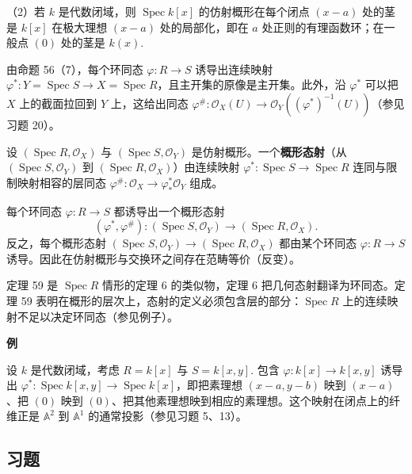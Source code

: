 （2）若 \(k\) 是代数闭域，则 \(\operatorname{Spec}k[x]\) 的仿射概形在每个闭点 \((x-a)\) 处的茎是 \(k[x]\) 在极大理想 \((x-a)\) 处的局部化，即在 \(a\) 处正则的有理函数环；在一般点 \((0)\) 处的茎是 \(k(x)\).

由命题 56（7），每个环同态 \(\varphi : R \to S\) 诱导出连续映射 \(\varphi^* : Y = \operatorname{Spec}S \to X = \operatorname{Spec}R\)，且主开集的原像是主开集。此外，沿 \(\varphi^*\) 可以把 \(X\) 上的截面拉回到 \(Y\) 上，这给出同态 \(\varphi^{\#} : \mathcal{O}_X(U) \to \mathcal{O}_Y((\varphi^*)^{-1}(U))\)（参见习题 20）。

\begin{definition}
设 \((\operatorname{Spec}R, \mathcal{O}_X)\) 与 \((\operatorname{Spec}S, \mathcal{O}_Y)\) 是仿射概形。一个\textbf{概形态射}（从 \((\operatorname{Spec}S, \mathcal{O}_Y)\) 到 \((\operatorname{Spec}R, \mathcal{O}_X)\)）由连续映射 \(\varphi^* : \operatorname{Spec}S \to \operatorname{Spec}R\) 连同与限制映射相容的层同态 \(\varphi^{\#} : \mathcal{O}_X \to \varphi^*_*\mathcal{O}_Y\) 组成。
\end{definition}

\begin{theorem}\label{thm:15.59}
每个环同态 \(\varphi : R \to S\) 都诱导出一个概形态射
\[
(\varphi^*, \varphi^{\#}) : (\operatorname{Spec}S, \mathcal{O}_Y) \to (\operatorname{Spec}R, \mathcal{O}_X).
\]
反之，每个概形态射 \((\operatorname{Spec}S, \mathcal{O}_Y) \to (\operatorname{Spec}R, \mathcal{O}_X)\) 都由某个环同态 \(\varphi : R \to S\) 诱导。因此在仿射概形与交换环之间存在范畴等价（反变）。
\end{theorem}

定理 59 是 \(\operatorname{Spec}R\) 情形的定理 6 的类似物，定理 6 把几何态射翻译为环同态。定理 59 表明在概形的层次上，态射的定义必须包含层的部分：\(\operatorname{Spec}R\) 上的连续映射不足以决定环同态（参见例子）。

\noindent\textbf{例}

设 \(k\) 是代数闭域，考虑 \(R = k[x]\) 与 \(S = k[x,y]\). 包含 \(\varphi : k[x] \to k[x,y]\) 诱导出 \(\varphi^* : \operatorname{Spec}k[x,y] \to \operatorname{Spec}k[x]\)，即把素理想 \((x-a,y-b)\) 映到 \((x-a)\)、把 \((0)\) 映到 \((0)\)、把其他素理想映到相应的素理想。这个映射在闭点上的纤维正是 \(\mathbb{A}^2\) 到 \(\mathbb{A}^1\) 的通常投影（参见习题 5、13）。

\subsection*{习题}

